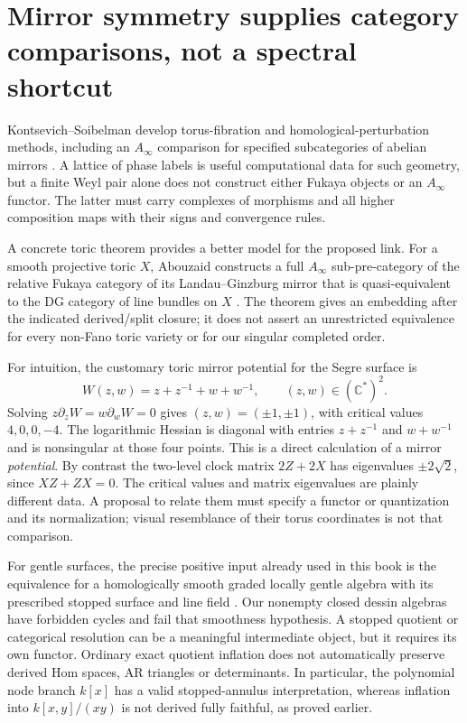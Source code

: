 \documentclass[11pt,oneside,openany]{book}
\theoremstyle{definition}\newtheorem{definition}[theorem]{Definition}
\theoremstyle{remark}\newtheorem{remark}[theorem]{Remark}
\newcommand{\C}{\mathbb C}\newcommand{\Z}{\mathbb Z}\newcommand{\R}{\mathbb R}
\begin{document}
\section{Mirror symmetry supplies category comparisons, not a spectral shortcut}
Kontsevich--Soibelman develop torus-fibration and homological-perturbation
methods, including an $A_\infty$ comparison for specified subcategories of
abelian mirrors \cite[Sections 6--8, Theorem 4]{TGKontsevichSoibelman}.
A lattice of phase labels is useful computational data for such geometry,
but a finite Weyl pair alone does not construct either Fukaya objects or
an $A_\infty$ functor. The latter must carry complexes of morphisms and
all higher composition maps with their signs and convergence rules.

A concrete toric theorem provides a better model for the proposed link.
For a smooth projective toric $X$, Abouzaid constructs a full
$A_\infty$ sub-pre-category of the relative Fukaya category of its
Landau--Ginzburg mirror that is quasi-equivalent to the DG category of
line bundles on $X$ \cite[Theorem 1.2 and Corollary 1.4]{TGAbouzaid}.
The theorem gives an embedding after the indicated derived/split closure;
it does not assert an unrestricted equivalence for every non-Fano toric
variety or for our singular completed order.

For intuition, the customary toric mirror potential for the Segre surface
is
\[
 W(z,w)=z+z^{-1}+w+w^{-1},\qquad (z,w)\in(\C^*)^2.
\]
Solving $z\partial_zW=w\partial_wW=0$ gives
$(z,w)=(\pm1,\pm1)$, with critical values $4,0,0,-4$.
The logarithmic Hessian is diagonal with entries $z+z^{-1}$ and
$w+w^{-1}$ and is nonsingular at those four points. This is a direct
calculation of a mirror \emph{potential}. By contrast the two-level clock
matrix $2Z+2X$ has eigenvalues $\pm2\sqrt2$, since $XZ+ZX=0$.
The critical values and matrix eigenvalues are plainly different data.
A proposal to relate them must specify a functor or quantization and its
normalization; visual resemblance of their torus coordinates is not that
comparison.

For gentle surfaces, the precise positive input already used in this
book is the equivalence for a homologically smooth graded locally gentle
algebra with its prescribed stopped surface and line field
\cite[Theorem 3.2.2]{LekiliPolishchuk}. Our nonempty closed dessin algebras
have forbidden cycles and fail that smoothness hypothesis. A stopped
quotient or categorical resolution can be a meaningful intermediate
object, but it requires its own functor. Ordinary exact quotient
inflation does not automatically preserve derived Hom spaces, AR
triangles or determinants. In particular, the polynomial node branch
$k[x]$ has a valid stopped-annulus interpretation, whereas inflation into
$k[x,y]/(xy)$ is not derived fully faithful, as proved earlier.
\end{document}
